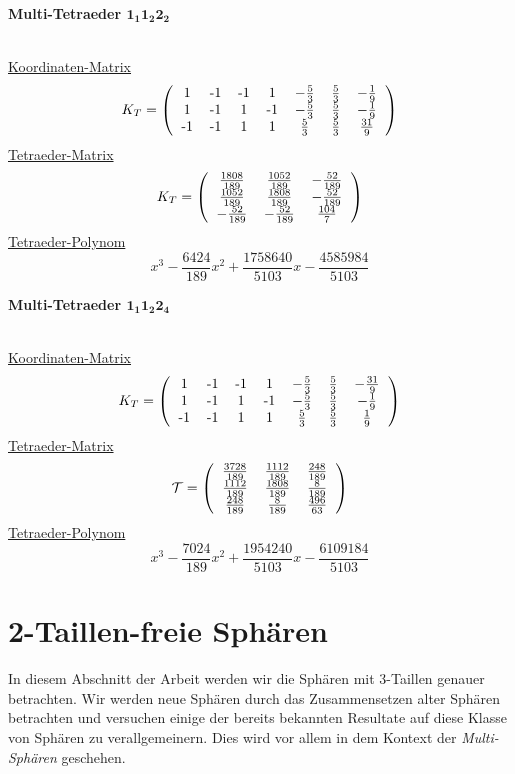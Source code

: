 \documentclass[12pt,titlepage,twoside,cleardoublepage]{article}
\theoremstyle{nummermitklammern}
\numberwithin{equation}{section}
\begin{document}
 \begin{large}
 \textbf{Multi-Tetraeder $\textbf{1}_\textbf{1}\textbf{1}_\textbf{2}\textbf{2}_\textbf{2}$}
 \end{large}\\
 \underline{Koordinaten-Matrix}
\[
K_T=\left(\begin{tabular}{ccccccc}
 1&-1&-1&1&$-\frac{5}{3}$&$\frac{5}{3}$&$-\frac{1}{9}$\\
 1&-1&1&-1&$-\frac{5}{3}$&$\frac{5}{3}$&$-\frac{1}{9}$\\
-1&-1&1&1&$\frac{5}{3}$&$\frac{5}{3}$&$\frac{31}{9}$\\
\end{tabular}\right)
\] 
\underline{Tetraeder-Matrix}
\[
K_T=\left(\begin{tabular}{ccc}
$\frac{1808}{189}$& $\frac{1052}{189}$& $-\frac{52}{189}$ \\
 $\frac{1052}{189}$& $\frac{1808}{189}$& $-\frac{52}{189}$ \\
 $-\frac{52}{189}$& $-\frac{52}{189}$& $\frac{104}{7}$ \\ 
\end{tabular}\right)
\]
\underline{Tetraeder-Polynom}
\[
  x^3-\frac{6424}{189}x^2+\frac{1758640}{5103}x-\frac{4585984}{5103}
\]
 \begin{large}
 \textbf{Multi-Tetraeder $\textbf{1}_\textbf{1}\textbf{1}_\textbf{2}\textbf{2}_\textbf{4}$}
 \end{large}\\
\underline{Koordinaten-Matrix} 
 \[
K_T=\left(\begin{tabular}{ccccccc}
 1&-1&-1&1&$-\frac{5}{3}$&$\frac{5}{3}$&$-\frac{31}{9}$\\
 1&-1&1&-1&$-\frac{5}{3}$&$\frac{5}{3}$&$-\frac{1}{9}$\\
-1&-1&1&1&$\frac{5}{3}$&$\frac{5}{3}$&$\frac{1}{9}$\\
\end{tabular}\right)
\] 
\underline{Tetraeder-Matrix}
\[
\mathcal{T}=\left(\begin{tabular}{ccc}
 $\frac{3728}{189}$&$\frac{1112}{189}$& $\frac{248}{189}$\\
 $\frac{1112}{189}$& $\frac{1808}{189}$& $\frac{8}{189}$ \\
 $\frac{248}{189}$& $\frac{8}{189}$&$\frac{ 496}{63}$ \\
\end{tabular}\right)
\]
\underline{Tetraeder-Polynom}
\[
  x^3-\frac{7024}{189}x^2+\frac{1954240}{5103}x-\frac{6109184}{5103} 
\] 
 \section{2-Taillen-freie Sphären}
In diesem Abschnitt der Arbeit werden wir die Sphären mit 3-Taillen genauer betrachten. Wir werden neue Sphären durch das Zusammensetzen alter Sphären betrachten und versuchen einige der bereits bekannten Resultate auf diese Klasse von Sphären zu verallgemeinern. Dies wird vor allem in dem Kontext der \emph{Multi-Sphären} geschehen.
\end{document}
